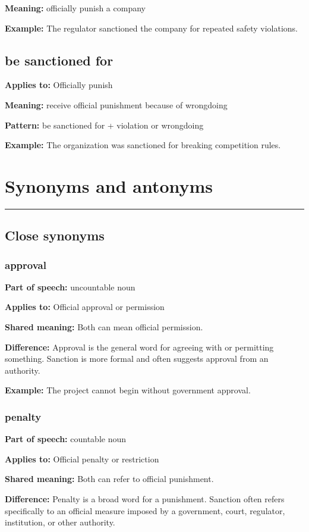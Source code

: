 \documentclass[11pt]{article}
\newcommand{\sectionrule}{\par\vspace{-0.5em}\noindent\textcolor{Accent}{\rule{\linewidth}{0.6pt}}\par}
\begin{document}
\textbf{Meaning:} officially punish a company

\textbf{Example:} The regulator sanctioned the company for repeated safety violations.

\subsection{be sanctioned for}
\textbf{Applies to:} Officially punish

\textbf{Meaning:} receive official punishment because of wrongdoing

\textbf{Pattern:} be sanctioned for + violation or wrongdoing

\textbf{Example:} The organization was sanctioned for breaking competition rules.

\section{Synonyms and antonyms}
\sectionrule
\subsection{Close synonyms}
\subsubsection{approval}
\textbf{Part of speech:} uncountable noun

\textbf{Applies to:} Official approval or permission

\textbf{Shared meaning:} Both can mean official permission.

\textbf{Difference:} Approval is the general word for agreeing with or permitting something. Sanction is more formal and often suggests approval from an authority.

\textbf{Example:} The project cannot begin without government approval.

\subsubsection{penalty}
\textbf{Part of speech:} countable noun

\textbf{Applies to:} Official penalty or restriction

\textbf{Shared meaning:} Both can refer to official punishment.

\textbf{Difference:} Penalty is a broad word for a punishment. Sanction often refers specifically to an official measure imposed by a government, court, regulator, institution, or other authority.
\end{document}
